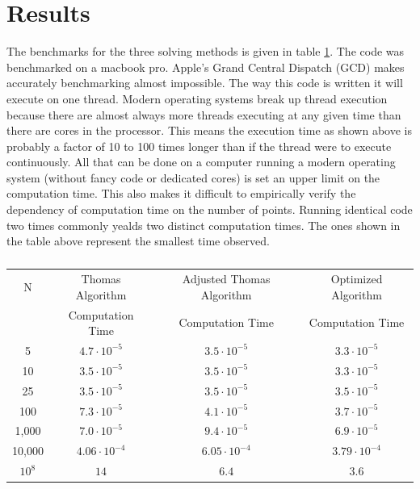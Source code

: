 \documentclass[twocolumn, groupedaddress]{revtex4-1}
\begin{document}
\section{Results}
The benchmarks for the three solving methods is given in table \ref{table:benchmarks}.  The code was benchmarked on a macbook pro.  Apple’s Grand Central Dispatch (GCD) makes accurately benchmarking almost impossible.  The way this code is written it will execute on one thread.  Modern operating systems break up thread execution because there are almost always more threads executing at any given time than there are cores in the processor.  This means the execution time as shown above is probably a factor of 10 to 100 times longer than if the thread were to execute continuously.  All that can be done on a computer running a modern operating system (without fancy code or dedicated cores) is set an upper limit on the computation time.  This also makes it difficult to empirically verify the dependency of computation time on the number of points.  Running identical code two times commonly yealds two distinct computation times.  The ones shown in the table above represent the smallest time observed.

\begin{table}
	\centering
	\begin{tabular}{ c | c | c | c }
		N      &  Thomas Algorithm    &  Adjusted Thomas Algorithm  & Optimized Algorithm  \\
		       &  Computation Time    &       Computation Time      &  Computation Time    \\
		\hline
		5      & $4.7 \cdot 10^{-5}$  &     $3.5 \cdot 10^{-5}$     & $3.3 \cdot 10^{-5}$  \\
		\hline
		10     & $3.5 \cdot 10^{-5}$  &     $3.5 \cdot 10^{-5}$     & $3.3 \cdot 10^{-5}$  \\
		\hline
		25     & $3.5 \cdot 10^{-5}$  &     $3.5 \cdot 10^{-5}$     & $3.5 \cdot 10^{-5}$  \\
		\hline
		100    & $7.3 \cdot 10^{-5}$  &     $4.1 \cdot 10^{-5}$     & $3.7 \cdot 10^{-5}$  \\
		\hline
		1,000  & $7.0 \cdot 10^{-5}$  &     $9.4 \cdot 10^{-5}$     & $6.9 \cdot 10^{-5}$  \\
		\hline
		10,000 & $4.06 \cdot 10^{-4}$ &     $6.05 \cdot 10^{-4}$    & $3.79 \cdot 10^{-4}$ \\
		\hline 
		$10^8$ &        $14$          &            $6.4$           &        $3.6$
	\end{tabular}
	\caption{\label{table:benchmarks}}
\end{table}
\end{document}
